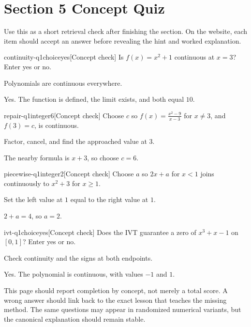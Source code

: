 \section*{Section 5 Concept Quiz}

Use this as a short retrieval check after finishing the section. On the website, each item should accept an answer before revealing the hint and worked explanation.

\begin{bgcheck}{continuity-q1}{choice}{yes}[Concept check]
Is \(f(x)=x^2+1\) continuous at \(x=3\)? Enter yes or no.
\begin{bghint}
Polynomials are continuous everywhere.
\end{bghint}
\begin{bgreveal}
Yes. The function is defined, the limit exists, and both equal \(10\).
\end{bgreveal}
\end{bgcheck}

\begin{bgcheck}{repair-q1}{integer}{6}[Concept check]
Choose \(c\) so \(f(x)=\frac{x^2-9}{x-3}\) for \(x\ne3\), and \(f(3)=c\), is continuous.
\begin{bghint}
Factor, cancel, and find the approached value at \(3\).
\end{bghint}
\begin{bgreveal}
The nearby formula is \(x+3\), so choose \(c=6\).
\end{bgreveal}
\end{bgcheck}

\begin{bgcheck}{piecewise-q1}{integer}{2}[Concept check]
Choose \(a\) so \(2x+a\) for \(x<1\) joins continuously to \(x^2+3\) for \(x\ge1\).
\begin{bghint}
Set the left value at \(1\) equal to the right value at \(1\).
\end{bghint}
\begin{bgreveal}
\(2+a=4\), so \(a=2\).
\end{bgreveal}
\end{bgcheck}

\begin{bgcheck}{ivt-q1}{choice}{yes}[Concept check]
Does the IVT guarantee a zero of \(x^3+x-1\) on \([0,1]\)? Enter yes or no.
\begin{bghint}
Check continuity and the signs at both endpoints.
\end{bghint}
\begin{bgreveal}
Yes. The polynomial is continuous, with values \(-1\) and \(1\).
\end{bgreveal}
\end{bgcheck}

\begin{bgsummary}[title={Quiz use on the website}]
This page should report completion by concept, not merely a total score. A wrong answer should link back to the exact lesson that teaches the missing method. The same questions may appear in randomized numerical variants, but the canonical explanation should remain stable.
\end{bgsummary}
